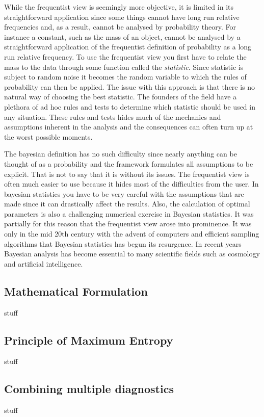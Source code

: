 \documentclass	[12pt]{article}
\begin{document}
While the frequentist view is seemingly more objective, it is limited in its straightforward application since some things cannot have long run relative frequencies and, as a result, cannot be analysed by probability theory. For instance a constant, such as the mass of an object, cannot be analysed by a straightforward application of the frequentist definition of probability as a long run relative frequency. To use the frequentist view you first have to relate the mass to the data through some function called the \emph{statistic}. Since statistic is subject to random noise it becomes the random variable to which the rules of probability can then be applied. The issue with this approach is that there is no natural way of choosing the best statistic. The founders of the field have a plethora of ad hoc rules and tests to determine which statistic should be used in any situation. These rules and tests hides much of the mechanics and assumptions inherent in the analysis and the consequences can often turn up at the worst possible moments.\cite{sivia2006data}

The bayesian definition has no such difficulty since nearly anything can be thought of as a probability and the framework formulates all assumptions to be explicit. That is not to say that it is without its issues. The frequentist view is often much easier to use because it hides most of the difficulties from the user. In bayesian statistics you have to be very careful with the assumptions that are made since it can drastically affect the results. Also, the calculation of optimal parameters is also a challenging numerical exercise in Bayesian statistics. It was partially for this reason that the frequentist view arose into prominence. It was only in the mid 20th century with the advent of computers and efficient sampling algorithms that Bayesian statistics has begun its resurgence. In recent years Bayesian analysis has become essential to many scientific fields such as cosmology and artificial intelligence.\cite{von2011bayesian}
\subsection{Mathematical Formulation}
stuff
\subsection{Principle of Maximum Entropy}
stuff
\subsection{Combining multiple diagnostics}
stuff
\end{document}
